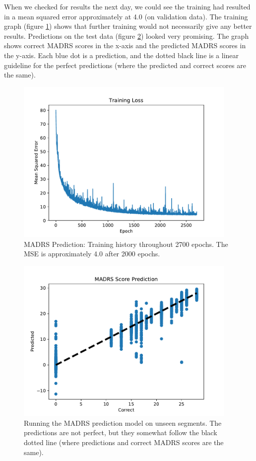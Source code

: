 When we checked for results the next day, we could see the training had resulted in a mean squared error approximately at 4.0 (on validation data). The training graph (figure \ref{figure:madrs_prediction_history}) shows that further training would not necessarily give any better results. Predictions on the test data (figure \ref{figure:madrs_prediction_testset}) looked very promising. The graph shows correct MADRS scores in the x-axis and the predicted MADRS scores in the y-axis. Each blue dot is a prediction, and the dotted black line is a linear guideline for the perfect predictions (where the predicted and correct scores are the same). 

\begin{figure}[h]
\begin{center}
      \includegraphics[height=8cm]{img/madrs_prediction/train_history.pdf}
      \caption{MADRS Prediction: Training history throughout 2700 epochs. The MSE is approximately 4.0 after 2000 epochs.}
      \label{figure:madrs_prediction_history}
\end{center}
\end{figure}

\begin{figure}[h]
\begin{center}
      \includegraphics[height=8cm]{img/madrs_prediction/predictions.pdf}
      \caption{Running the MADRS prediction model on unseen segments. The predictions are not perfect, but they somewhat follow the black dotted line (where predictions and correct MADRS scores are the same).}
      \label{figure:madrs_prediction_testset}
\end{center}
\end{figure}

